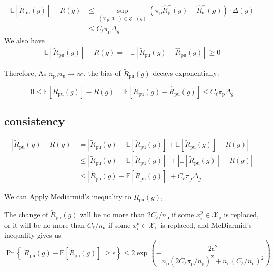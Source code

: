 \documentclass[12pt]{article}
\theoremstyle{definition}
\begin{document}
 $$
\begin{aligned}
\mathbb{E}\left[\widetilde{R}_{\mathrm{pu}}(g)\right]-R(g) &\le \sup _{\left(\mathcal{X}_{\mathrm{p}}, \mathcal{X}_{\mathrm{u}}\right) \in \mathfrak{D}^{-}(g)}\left(\pi_{\mathrm{p}} \widehat{R}_{\mathrm{p}}^{-}(g)-\widehat{R}_{\mathrm{u}}^{-}(g)\right) \cdot \Delta(g) \\
 & \leq C_{\ell} \pi_{\mathrm{p}} \Delta_{g}
\end{aligned}
$$
We also have
 \[
\begin{aligned}
\mathbb{E}\left[\widetilde{R}_{\mathrm{pu}}(g)\right]-R(g)=& \mathbb{E}\left[\widetilde{R}_{\mathrm{pu}}(g)-\widehat{R}_{\mathrm{pu}}(g)\right] \ge 0
\end{aligned}
\]

Therefore, As $n_\mathrm{p}$,$n_\mathrm{u}\rightarrow \infty$, the bias of $\widetilde{R}_{\mathrm{pu}}(g)$ decays exponentially:

\begin{equation}
\label{thm:bias-consistency}
	0 \le \mathbb{E}\left[\widetilde{R}_{\mathrm{pu}}(g)\right]-R(g)= \mathbb{E}\left[\widetilde{R}_{\mathrm{pu}}(g)-\widehat{R}_{\mathrm{pu}}(g)\right] \le C_{\ell}\pi_\mathrm{p}\Delta_{g}
\end{equation}

\subsection{consistency}

\begin{equation}
\begin{aligned}
\left|\widetilde{R}_{\mathrm{pu}}(g)-R(g)\right| 
& = \left|\widetilde{R}_{\mathrm{pu}}(g)-\mathbb{E}[\widetilde{R}_{\mathrm{pu}}(g)]+\mathbb{E}[\widetilde{R}_{\mathrm{pu}}(g)]-R(g)\right| \\
& \le |\widetilde{R}_{\mathrm{pu}}(g)-\mathbb{E}[\widetilde{R}_{\mathrm{pu}}(g)]| +|\mathbb{E}[\widetilde{R}_{\mathrm{pu}}(g)]-R(g)| \\
& \le |\widetilde{R}_{\mathrm{pu}}(g)-\mathbb{E}[\widetilde{R}_{\mathrm{pu}}(g)]| +C_{\ell}\pi_\mathrm{p}\Delta_{g}
\end{aligned}
\end{equation}

We can Apply Mcdiarmid's inequality to $\widetilde{R}_{\mathrm{pu}}(g)$, 

The change of $\widetilde{R}_{\mathrm{pu}}(g)$ will be no more than $2 C_{\ell} / n_{\mathrm{p}}$ if some $x_{i}^{\mathrm{p}} \in \mathcal{X}_{\mathrm{p}}$ is replaced, or it will be no more than $C_{\ell} / n_{\mathrm{u}}$ if some $x_{i}^{\mathrm{u}} \in \mathcal{X}_{\mathrm{u}}$ is replaced, and McDiarmid's inequality gives us
\[
\operatorname{Pr}\left\{\left|\widetilde{R}_{\mathrm{pu}}(g)-\mathbb{E}\left[\widetilde{R}_{\mathrm{pu}}(g)\right]\right| \geq \epsilon\right\} \leq 2 \exp \left(-\frac{2 \epsilon^{2}}{n_{\mathrm{p}}\left(2 C_{\ell} \pi_{\mathrm{p}} / n_{\mathrm{p}}\right)^{2}+n_{\mathrm{u}}\left(C_{\ell} / n_{\mathrm{u}}\right)^{2}}\right)
\]
\end{document}
